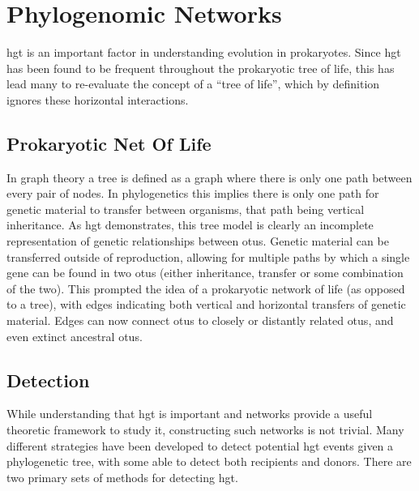 \documentclass[12pt,letter]{article}
\begin{document}
\section*{Phylogenomic Networks}
\ac{hgt} is an important factor in understanding evolution in prokaryotes.
Since \ac{hgt} has been found to be frequent throughout the prokaryotic tree of life, this has lead many to re-evaluate the concept of a ``tree of life'', which by definition ignores these horizontal interactions\citep{netoflife}.
\subsection*{Prokaryotic Net Of Life}
In graph theory a tree is defined as a graph where there is only one path between every pair of nodes.
In phylogenetics this implies there is only one path for genetic material to transfer between organisms, that path being vertical inheritance.
As \ac{hgt} demonstrates, this tree model is clearly an incomplete representation of genetic relationships between \ac{otu}s.
Genetic material can be transferred outside of reproduction, allowing for multiple paths by which a single gene can be found in two \ac{otu}s (either inheritance, transfer or some combination of the two)\citep{lgt}.
This prompted the idea of a prokaryotic network of life (as opposed to a tree), with edges indicating both vertical and horizontal transfers of genetic material\citep{netoflife}.
Edges can now connect \ac{otu}s to closely or distantly related \ac{otu}s, and even extinct ancestral \ac{otu}s.
\subsection*{Detection}%
While understanding that \ac{hgt} is important and networks provide a useful theoretic framework to study it, constructing such networks is not trivial.
Many different strategies have been developed to detect potential \ac{hgt} events given a phylogenetic tree, with some able to detect both recipients and donors\citep{ihgt}.
There are two primary sets of methods for detecting \ac{hgt}.
\end{document}
